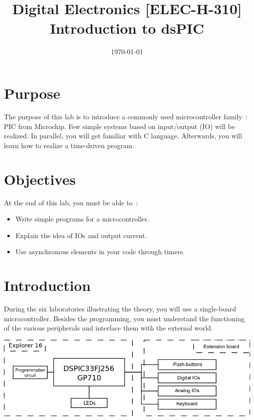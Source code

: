 \documentclass[11pt,a4paper]{article}
\date{\vspace{-1.7cm}\mydate\today}
\title{\vspace{-2cm} \labonumber\\ Digital Electronics [ELEC-H-310]\\ Introduction to dsPIC\ifthenelse{\boolean{corrige}}{~\\Solution}{}}
\theoremstyle{definition}%
\begin{document}
\pagestyle{empty}
\maketitle
\section*{Purpose}
The purpose of this lab is to introduce a commonly used microcontroller family~: PIC from Microchip.
Few simple systems based on input/output (IO) will be realized.
In parallel, you will get familiar with C language.
Afterwards, you will learn how to realize a time-driven program.


\section*{Objectives}
At the end of this lab, you must be able to~:
\begin{itemize}
\item Write simple programs for a microcontroller.
\item Explain the idea of IOs and output current.
\item Use asynchronous elements in your code through timers.
\end{itemize}
\newpage{}


\section{Introduction}
During the six laboratories illustrating the theory, you will use a single-board microcontroller.
Besides the programming, you must understand the functioning of the various peripherals and interface them with the external world.

\includegraphics[width=\textwidth]{ENpic33}
\end{document}
